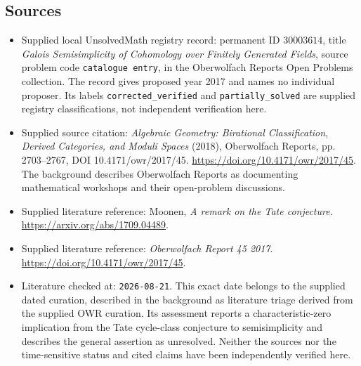 \documentclass[11pt]{article}
\begin{document}
\subsection{Sources}
\begin{itemize}
\item Supplied local UnsolvedMath registry record: permanent ID \(30003614\), title \emph{Galois Semisimplicity of Cohomology over Finitely Generated Fields}, source problem code \texttt{catalogue entry}, in the Oberwolfach Reports Open Problems collection. The record gives proposed year 2017 and names no individual proposer. Its labels \texttt{corrected\_verified} and \texttt{partially\_solved} are supplied registry classifications, not independent verification here.
\item Supplied source citation: \emph{Algebraic Geometry: Birational Classification, Derived Categories, and Moduli Spaces} (2018), Oberwolfach Reports, pp. 2703--2767, DOI 10.4171/owr/2017/45. \url{https://doi.org/10.4171/owr/2017/45}. The background describes Oberwolfach Reports as documenting mathematical workshops and their open-problem discussions.
\item Supplied literature reference: Moonen, \emph{A remark on the Tate conjecture}. \url{https://arxiv.org/abs/1709.04489}.
\item Supplied literature reference: \emph{Oberwolfach Report 45 2017}. \url{https://doi.org/10.4171/owr/2017/45}.
\item Literature checked at: \texttt{2026-08-21}. This exact date belongs to the supplied dated curation, described in the background as literature triage derived from the supplied OWR curation. Its assessment reports a characteristic-zero implication from the Tate cycle-class conjecture to semisimplicity and describes the general assertion as unresolved. Neither the sources nor the time-sensitive status and cited claims have been independently verified here.
\end{itemize}
\end{document}
